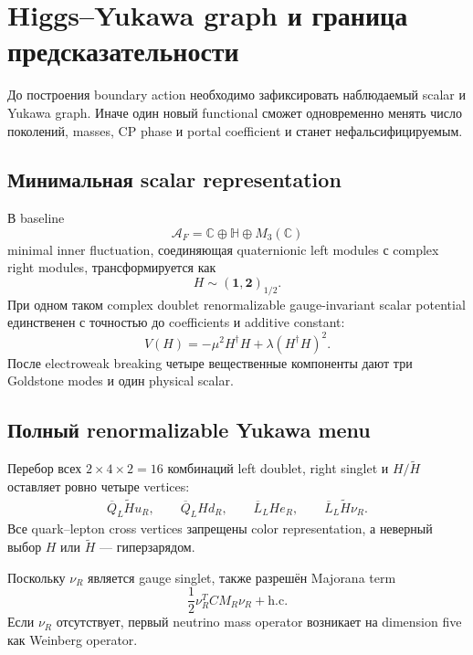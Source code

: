 \chapter{Higgs--Yukawa graph и граница предсказательности}

До построения boundary action необходимо зафиксировать наблюдаемый scalar и
Yukawa graph. Иначе один новый functional сможет одновременно менять число
поколений, masses, CP phase и portal coefficient и станет нефальсифицируемым.

\section{Минимальная scalar representation}

В baseline
\begin{equation}
\mathcal A_F=\mathbb C\oplus\mathbb H\oplus M_3(\mathbb C)
\end{equation}
minimal inner fluctuation, соединяющая quaternionic left modules с complex
right modules, трансформируется как
\begin{equation}
H\sim(\mathbf1,\mathbf2)_{1/2}.
\end{equation}
При одном таком complex doublet renormalizable gauge-invariant scalar
potential единственен с точностью до coefficients и additive constant:
\begin{equation}
V(H)=-\mu^2H^\dagger H+\lambda(H^\dagger H)^2.
\end{equation}
После electroweak breaking четыре вещественные компоненты дают три Goldstone
modes и один physical scalar.

\section{Полный renormalizable Yukawa menu}

Перебор всех \(2\times4\times2=16\) комбинаций left doublet, right singlet и
\(H/\widetilde H\) оставляет ровно четыре vertices:
\begin{align}
\overline Q_L\widetilde H u_R,
\qquad
\overline Q_L H d_R,
\qquad
\overline L_L H e_R,
\qquad
\overline L_L\widetilde H\nu_R.
\end{align}
Все quark--lepton cross vertices запрещены color representation, а неверный
выбор \(H\) или \(\widetilde H\) --- гиперзарядом.

Поскольку \(\nu_R\) является gauge singlet, также разрешён Majorana term
\begin{equation}
\frac12\nu_R^T C M_R\nu_R+\mathrm{h.c.}
\end{equation}
Если \(\nu_R\) отсутствует, первый neutrino mass operator возникает на
dimension five как Weinberg operator.

